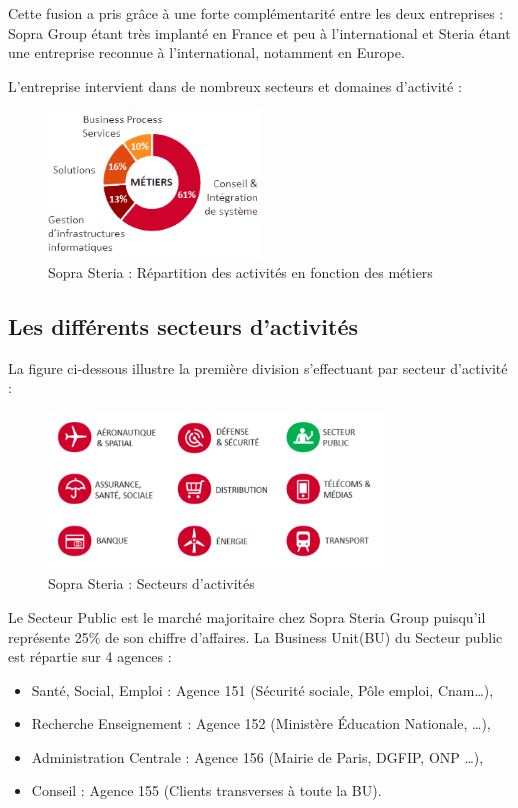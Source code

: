 Cette fusion a pris grâce à une forte complémentarité entre les deux entreprises : Sopra Group étant très implanté en France et peu à l'international et Steria étant une entreprise reconnue à l'international, notamment en Europe.

L’entreprise intervient dans de nombreux secteurs et domaines d’activité :

\begin{figure}[!h]
\centering
\includegraphics[width=0.5\textwidth]{images/metier_soprasteria.png}
\caption{Sopra Steria : Répartition des activités en fonction des métiers}
\end{figure}

\subsection{Les différents secteurs d'activités}

La figure ci-dessous illustre la première division s’effectuant par secteur d’activité :

\begin{figure}[!h]
\centering
\includegraphics[width=0.8\textwidth]{images/secteurActivite.png}
\caption{Sopra Steria : Secteurs d'activités}
\end{figure}

Le Secteur Public est le marché majoritaire chez Sopra Steria Group puisqu’il représente 25\% de son chiffre d’affaires. La Business Unit(BU) du Secteur public est répartie sur 4 agences :  

\begin{itemize}
    \item Santé, Social, Emploi : Agence 151 (Sécurité sociale, Pôle emploi, Cnam…), 
    \item Recherche Enseignement : Agence 152 (Ministère Éducation Nationale, …), 
    \item Administration Centrale : Agence 156 (Mairie de Paris, DGFIP, ONP …), 
    \item Conseil : Agence 155 (Clients transverses à toute la BU). 
\end{itemize}

